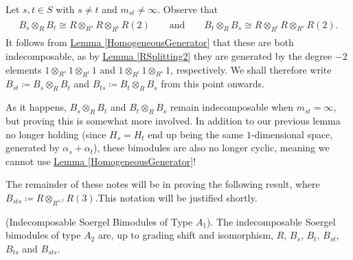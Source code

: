 \noindent Let $s, t \in S$ with $s \neq t$ and $m_{st} \neq \infty$. Observe that
\begin{align*}
\begin{split}
B_s \otimes_R B_t \cong R \otimes_{R^s} R \otimes_{R^t} R(2)\qquad\text{and}\qquad B_t \otimes_R B_s \cong R \otimes_{R^t} R \otimes_{R^s} R(2).
\end{split}
\end{align*}
\noindent It follows from \hyperref[HomogeneousGenerator]{Lemma \ref*{HomogeneousGenerator}} that these are both indecomposable, as by \hyperref[RSplitting2]{Lemma \ref*{RSplitting2}} they are generated by the degree $-2$ elements $1 \otimes_{R^s} 1 \otimes_{R^t} 1$ and $1 \otimes_{R^t} 1 \otimes_{R^s} 1$, respectively. We shall therefore write $B_{st} \coloneqq B_s \otimes_R B_t$ and $B_{ts} \coloneqq B_t \otimes_R B_s$ from this point onwards.\\

\noindent\begin{remark} As it happens, $B_s \otimes_R B_t$ and $B_t \otimes_R B_s$ remain indecomposable when $m_{st} = \infty$, but proving this is somewhat more involved. In addition to our previous lemma no longer holding (since $H_s = H_t$ end up being the same $1$-dimensional space, generated by $\alpha_s + \alpha_t$), these bimodules are also no longer cyclic, meaning we cannot use \hyperref[HomogeneousGenerator]{Lemma \ref*{HomogeneousGenerator}}!\\
\end{remark}

\noindent The remainder of these notes will be in proving the following result, where $B_{sts} \coloneqq R \otimes_{R^{s,t}} R(3)$.\linebreak This notation will be justified shortly.\\

\noindent\begin{proposition}\textup{(Indecomposable Soergel Bimodules of Type $A_1$).} The indecomposable Soergel bimodules of type $A_2$ are, up to grading shift and isomorphism, $R$, $B_s$, $B_t$, $B_{st}$, $B_{ts}$ and $B_{sts}$.\\
\end{proposition}

